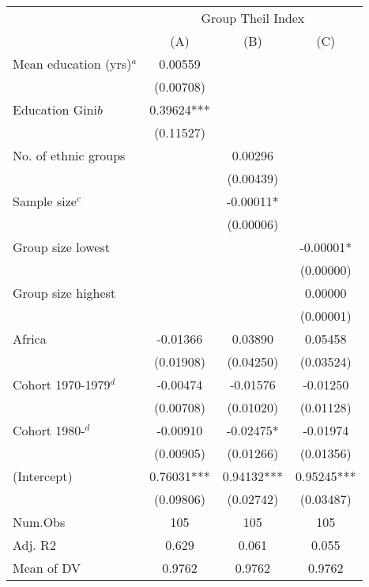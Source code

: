 
\begin{tabular}[t]{lccc}
\toprule
\multicolumn{1}{c}{ } & \multicolumn{3}{c}{Group Theil Index} \\
\cmidrule(l{3pt}r{3pt}){2-4}
  & (A) & (B) & (C)\\
\midrule
Mean education (yrs)$^a$ & 0.00559 &  & \\
 & (0.00708) &  & \\
Education Gini$b$ & 0.39624*** &  & \\
 & (0.11527) &  & \\
No. of ethnic groups &  & 0.00296 & \\
 &  & (0.00439) & \\
Sample size$^c$ &  & -0.00011* & \\
 &  & (0.00006) & \\
Group size lowest &  &  & -0.00001*\\
 &  &  & (0.00000)\\
Group size highest &  &  & 0.00000\\
 &  &  & (0.00001)\\
Africa & -0.01366 & 0.03890 & 0.05458\\
 & (0.01908) & (0.04250) & (0.03524)\\
Cohort 1970-1979$^d$ & -0.00474 & -0.01576 & -0.01250\\
 & (0.00708) & (0.01020) & (0.01128)\\
Cohort 1980-$^d$ & -0.00910 & -0.02475* & -0.01974\\
 & (0.00905) & (0.01266) & (0.01356)\\
(Intercept) & 0.76031*** & 0.94132*** & 0.95245***\\
 & (0.09806) & (0.02742) & (0.03487)\\
\midrule
Num.Obs & 105 & 105 & 105\\
Adj. R2 & 0.629 & 0.061 & 0.055\\
Mean of DV & 0.9762 & 0.9762 & 0.9762\\
\bottomrule
\end{tabular}
